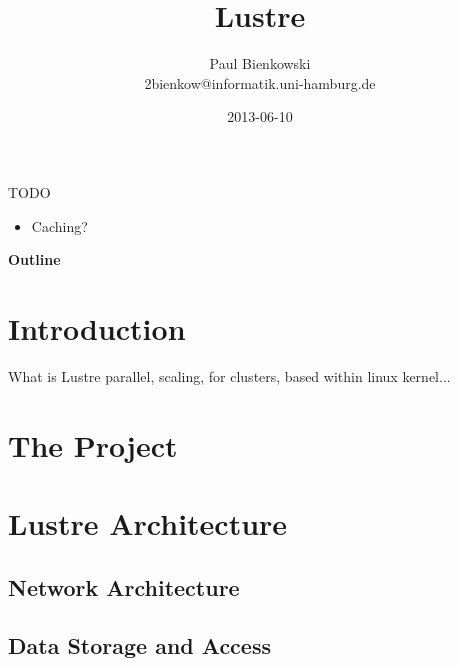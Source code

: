 \documentclass[compress,t,xcolor=dvipsnames]{beamer}
\title{Lustre}
\author{Paul Bienkowski \\[0.2em] \scriptsize 2bienkow@informatik.uni-hamburg.de}
\institute{Proseminar ``Ein-/Ausgabe - Stand der Wissenschaft''}
\date{2013-06-10}
\newif\iffinal
\newcommand{\sectiontoc}{
    \begin{frame}{\textbf{\insertsectionhead}}
        \tableofcontents[current]
    \end{frame}

    \addtocounter{framenumber}{-1}%
}
\begin{document}

\iffinal\else
\begin{frame}{TODO}
    \begin{itemize}
        \item Caching?
    \end{itemize}
\end{frame}
\fi

\begin{frame}
    \titlepage
\end{frame}

\begin{frame}{\textbf{Outline}}
    \tableofcontents
\end{frame}


\section{Introduction}

\begin{frame}{What is Lustre}
    parallel, scaling, for clusters, based within linux kernel...
\end{frame}


\section{The Project}
\sectiontoc




\section{Lustre Architecture}
\sectiontoc
\subsection{Network Architecture}
%

\subsection{Data Storage and Access}
%
\end{document}
